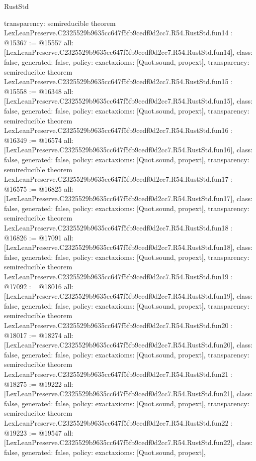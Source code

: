 \begin{lexlean}{RustStd}
\begin{coremodule}
{  transparency: semireducible
}
theorem LexLeanPreserve.C2325529b9635cc647f5fb9cedf0d2cc7.R54.RustStd.fun14 : @15367 := @15557 {
  all: [LexLeanPreserve.C2325529b9635cc647f5fb9cedf0d2cc7.R54.RustStd.fun14],
  class: false,
  generated: false,
  policy: exact{axioms: [Quot.sound, propext]},
  transparency: semireducible
}
theorem LexLeanPreserve.C2325529b9635cc647f5fb9cedf0d2cc7.R54.RustStd.fun15 : @15558 := @16348 {
  all: [LexLeanPreserve.C2325529b9635cc647f5fb9cedf0d2cc7.R54.RustStd.fun15],
  class: false,
  generated: false,
  policy: exact{axioms: [Quot.sound, propext]},
  transparency: semireducible
}
theorem LexLeanPreserve.C2325529b9635cc647f5fb9cedf0d2cc7.R54.RustStd.fun16 : @16349 := @16574 {
  all: [LexLeanPreserve.C2325529b9635cc647f5fb9cedf0d2cc7.R54.RustStd.fun16],
  class: false,
  generated: false,
  policy: exact{axioms: [Quot.sound, propext]},
  transparency: semireducible
}
theorem LexLeanPreserve.C2325529b9635cc647f5fb9cedf0d2cc7.R54.RustStd.fun17 : @16575 := @16825 {
  all: [LexLeanPreserve.C2325529b9635cc647f5fb9cedf0d2cc7.R54.RustStd.fun17],
  class: false,
  generated: false,
  policy: exact{axioms: [Quot.sound, propext]},
  transparency: semireducible
}
theorem LexLeanPreserve.C2325529b9635cc647f5fb9cedf0d2cc7.R54.RustStd.fun18 : @16826 := @17091 {
  all: [LexLeanPreserve.C2325529b9635cc647f5fb9cedf0d2cc7.R54.RustStd.fun18],
  class: false,
  generated: false,
  policy: exact{axioms: [Quot.sound, propext]},
  transparency: semireducible
}
theorem LexLeanPreserve.C2325529b9635cc647f5fb9cedf0d2cc7.R54.RustStd.fun19 : @17092 := @18016 {
  all: [LexLeanPreserve.C2325529b9635cc647f5fb9cedf0d2cc7.R54.RustStd.fun19],
  class: false,
  generated: false,
  policy: exact{axioms: [Quot.sound, propext]},
  transparency: semireducible
}
theorem LexLeanPreserve.C2325529b9635cc647f5fb9cedf0d2cc7.R54.RustStd.fun20 : @18017 := @18274 {
  all: [LexLeanPreserve.C2325529b9635cc647f5fb9cedf0d2cc7.R54.RustStd.fun20],
  class: false,
  generated: false,
  policy: exact{axioms: [Quot.sound, propext]},
  transparency: semireducible
}
theorem LexLeanPreserve.C2325529b9635cc647f5fb9cedf0d2cc7.R54.RustStd.fun21 : @18275 := @19222 {
  all: [LexLeanPreserve.C2325529b9635cc647f5fb9cedf0d2cc7.R54.RustStd.fun21],
  class: false,
  generated: false,
  policy: exact{axioms: [Quot.sound, propext]},
  transparency: semireducible
}
theorem LexLeanPreserve.C2325529b9635cc647f5fb9cedf0d2cc7.R54.RustStd.fun22 : @19223 := @19547 {
  all: [LexLeanPreserve.C2325529b9635cc647f5fb9cedf0d2cc7.R54.RustStd.fun22],
  class: false,
  generated: false,
  policy: exact{axioms: [Quot.sound, propext]},
}
\end{coremodule}
\end{lexlean}
